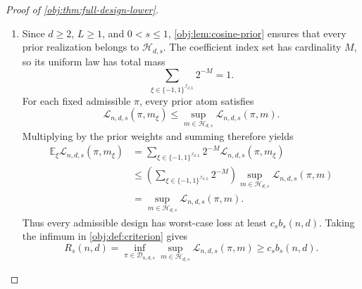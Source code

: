 \documentclass[11pt]{article}
\begin{document}
\begin{proof}[Proof of \cref{obj:thm:full-design-lower}]
\begin{enumerate}
\item
Since \(d\geq2\), \(L\geq1\), and \(0<s\leq1\),
\cref{obj:lem:cosine-prior} ensures that every prior realization belongs to
\(\mathcal H_{d,s}\). The coefficient index set has cardinality \(M\), so its uniform law has total mass
\[
\sum_{\xi\in\{-1,1\}^{\mathcal I_{d,L}}}2^{-M}=1.
\]
For each fixed admissible \(\pi\), every prior atom satisfies
\[
\mathcal L_{n,d,s}(\pi,m_\xi)
\leq
\sup_{m\in\mathcal H_{d,s}}\mathcal L_{n,d,s}(\pi,m).
\]
Multiplying by the prior weights and summing therefore yields
\[
\begin{aligned}
\mathbb E_\xi\mathcal L_{n,d,s}(\pi,m_\xi)
&=\sum_{\xi\in\{-1,1\}^{\mathcal I_{d,L}}}
 2^{-M}\mathcal L_{n,d,s}(\pi,m_\xi)\\
&\leq
\left(\sum_{\xi\in\{-1,1\}^{\mathcal I_{d,L}}}2^{-M}\right)
\sup_{m\in\mathcal H_{d,s}}\mathcal L_{n,d,s}(\pi,m)\\
&=\sup_{m\in\mathcal H_{d,s}}\mathcal L_{n,d,s}(\pi,m).
\end{aligned}
\]
Thus every admissible design has worst-case loss at least \(c_sb_s(n,d)\). Taking the infimum in \cref{obj:def:criterion} gives
\[
R_s(n,d)
=\inf_{\pi\in\mathcal D_{n,d,s}}
 \sup_{m\in\mathcal H_{d,s}}\mathcal L_{n,d,s}(\pi,m)
\geq c_sb_s(n,d).
\]
\end{enumerate}
\end{proof}
\end{document}
